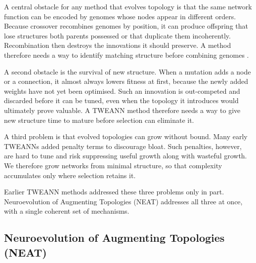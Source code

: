 \documentclass[12pt]{article}
\newcommand{\revGram}[2]{#2}
\newcommand{\revPlain}[2]{#2}
\newcommand{\revBrit}[2]{#2}
\begin{document}
A central obstacle for any method that evolves topology is that the same network function can be encoded by genomes whose nodes appear in different orders.
Because crossover recombines genomes by position, it can produce offspring that lose structures both parents possessed or that duplicate them incoherently.
Recombination then destroys the innovations it should preserve.
A method therefore needs a way to identify matching structure before combining genomes \parencite{stanley_evolving_2002}.

A second obstacle is the survival of new structure.
When a mutation adds a node or a connection, it almost always lowers fitness at first, because \revGram{G-11}{the newly added weights have not yet been} \revBrit{E-01}{optimised}.
Such an innovation is out-competed and discarded before it can be tuned, even when the topology it introduces would ultimately prove valuable.
A TWEANN method therefore needs a way to give new structure time to mature before selection can eliminate it.

A third problem is that \revGram{G-07}{evolved topologies can grow without bound}.
Many early TWEANNs added penalty terms to discourage bloat.
\revGram{G-04}{Such penalties, however, are hard to tune} and risk suppressing useful growth along with wasteful growth.
We therefore grow networks from minimal structure, so that complexity accumulates only where selection retains it.

Earlier TWEANN methods \revGram{G-03}{addressed these three problems only in part}.
Neuroevolution of Augmenting Topologies (NEAT) \parencite{stanley_evolving_2002} addresses all three at once, \revPlain{P-09}{with a single coherent set of mechanisms.}


\subsection{Neuroevolution of Augmenting Topologies (NEAT)}
\label{subsec:neuroevolution-of-augmenting-topologies-neat}
\end{document}
